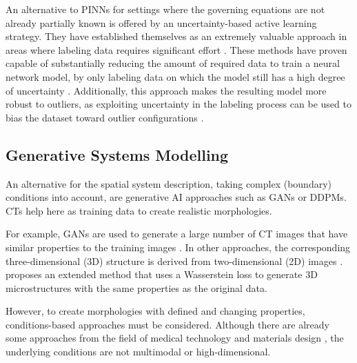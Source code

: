 An alternative to PINNs for settings where the governing equations are not already partially known is offered by an uncertainty-based active learning strategy. They have established themselves as an extremely valuable approach in areas where labeling data requires significant effort \cite{DAL}. These methods have proven capable of substantially reducing the amount of required data to train a neural network model, by only labeling data on which the model still has a high degree of uncertainty \cite{active}. Additionally, this approach makes the resulting model more robust to outliers, as exploiting uncertainty in the labeling process can be used to bias the dataset toward outlier configurations \cite{UAviaAL}. 

\subsection{Generative Systems Modelling}
An alternative for the spatial system description, taking complex (boundary) conditions into account, are generative AI approaches such as GANs or DDPMs. CTs help here as training data to create realistic morphologies. %

For example, GANs are used to generate a large number of CT images that have similar properties to the training images \cite{su2022microstructure}. 
In other approaches, the corresponding three-dimensional (3D) structure is derived from two-dimensional (2D) images \cite{FENG2020113043,ZHANG2021110018}.
\citet{Henkes_2022} proposes an extended method that uses a Wasserstein loss \cite{arjovsky2017wasserstein} to generate 3D microstructures with the same properties as the original data. 

However, to create morphologies with defined and changing properties, conditions-based approaches must be considered. Although there are already some approaches from the field of medical technology \cite{Jiang2020COVID19CI,Peng2023CBCTBasedSC,CganMed1} and materials design \cite{DURETH2023105608,janssens2020computed}, the underlying conditions are not multimodal or high-dimensional.

